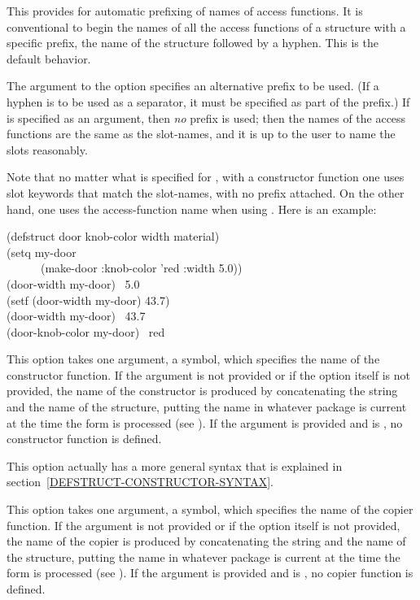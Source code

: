 \begin{flushdesc}
\item[\cd{:conc-name}]
This provides for automatic prefixing of names of access functions.
It is conventional to begin the names of all the access functions of
a structure with a specific prefix,
the name of the structure followed by a hyphen.
This is the default behavior.

The argument to the  option specifies an alternative
prefix to be used.  (If a hyphen is to be used as a separator,
it must be specified as part of the prefix.)
If {\false} is specified as an argument, then {\it no} prefix is used;
then the names of the access functions
are the same as the slot-names, and it is up to the user
to name the slots reasonably.

Note that no matter what is specified for ,
with a constructor function one uses
slot keywords that match the slot-names, with no prefix attached.
On the other hand, one uses the access-function name
when using .  Here is an example:
\begin{lisp}
(defstruct door knob-color width material) \\
(setq my-door \\
~~~~~~(make-door :knob-color 'red :width 5.0)) \\
(door-width my-door) \EV\ 5.0 \\
(setf (door-width my-door) 43.7) \\
(door-width my-door) \EV\ 43.7 \\
(door-knob-color my-door) \EV\ red
\end{lisp}

\item[\cd{:constructor}]
This option takes one argument, a symbol,
which specifies the name of the constructor
function.  If the argument is not provided or if the option itself is not
provided, the name of the constructor is produced by concatenating the
string  and the name of the structure, putting the name
in whatever package is current at the time the 
form is processed (see ).
If the argument is
provided and is {\false}, no constructor function is defined.

This option actually has a more general syntax that is explained
in section~\ref{DEFSTRUCT-CONSTRUCTOR-SYNTAX}.

\item[\cd{:copier}]
This option takes one argument, a symbol,
which specifies the name of the copier
function.  If the argument is not provided or if the option itself is not
provided, the name of the copier is produced by concatenating the
string  and the name of the structure, putting the name
in whatever package is current at the time the 
form is processed (see ).
If the argument is provided and is {\false}, no copier function is defined.


\end{flushdesc}
